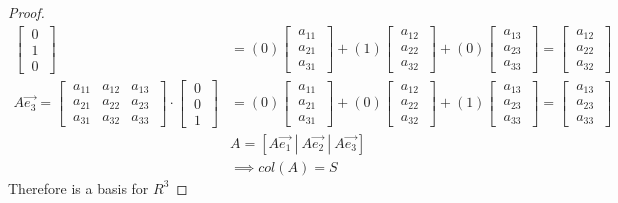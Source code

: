 \documentclass[../main.tex]{subfiles}
\begin{document}
\begin{proof}
\begin{align*}
\begin{bmatrix}
      \ 0 \ \\
      \ 1 \ \\
      \ 0 \
    \end{bmatrix}
     & =
    (0)\begin{bmatrix}
      \ a_{11} \ \\
      \ a_{21} \ \\
      \ a_{31} \
    \end{bmatrix}
    + (1)\begin{bmatrix}
      \ a_{12} \ \\
      \ a_{22} \ \\
      \ a_{32} \
    \end{bmatrix}
    + (0)\begin{bmatrix}
      \ a_{13} \ \\
      \ a_{23} \ \\
      \ a_{33} \
    \end{bmatrix}
    = \begin{bmatrix}
      \ a_{12} \ \\
      \ a_{22} \ \\
      \ a_{32} \
    \end{bmatrix}                         \\
    A\vec{e_3} =
    \begin{bmatrix}
      \ a_{11} & a_{12} & a_{13} \ \\
      \ a_{21} & a_{22} & a_{23} \ \\
      \ a_{31} & a_{32} & a_{33} \
    \end{bmatrix} \cdot
    \begin{bmatrix}
      \ 0 \ \\
      \ 0 \ \\
      \ 1 \
    \end{bmatrix}
     & =
    (0)\begin{bmatrix}
      \ a_{11} \ \\
      \ a_{21} \ \\
      \ a_{31} \
    \end{bmatrix}
    + (0)\begin{bmatrix}
      \ a_{12} \ \\
      \ a_{22} \ \\
      \ a_{32} \
    \end{bmatrix}
    + (1)\begin{bmatrix}
      \ a_{13} \ \\
      \ a_{23} \ \\
      \ a_{33} \
    \end{bmatrix}
    = \begin{bmatrix}
      \ a_{13} \ \\
      \ a_{23} \ \\
      \ a_{33} \
    \end{bmatrix}                         \\
     & A = [ A\vec{e_1} \ | \ A\vec{e_2}\ |\ A\vec{e_3}] \\
     & \implies col(A)=S
  \end{align*}
  Therefore  is a basis for $R^3$
\end{proof}
\end{document}
